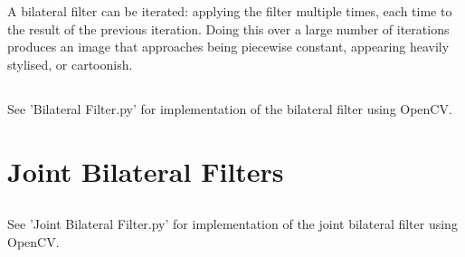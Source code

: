 \documentclass{article}
\begin{document}
	A bilateral filter can be iterated: applying the filter multiple times, each time to the result of the previous iteration. Doing this over a large number of iterations produces an image that approaches being piecewise constant, appearing heavily stylised, or cartoonish.
	
	\subsection{}
	See 'Bilateral Filter.py' for implementation of the bilateral filter using OpenCV.
	
	\subsection{}	
	\newpage
	\section{Joint Bilateral Filters}
	\subsection{}	
	
	\subsection{}
	See 'Joint Bilateral Filter.py' for implementation of the joint bilateral filter using OpenCV.
	
	\subsection{}
\end{document}
